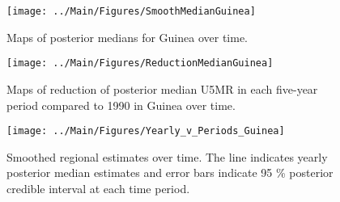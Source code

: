 \documentclass[12pt]{article}\usepackage[]{graphicx}\usepackage[]{color}
\newenvironment{knitrout}{}{} %
\begin{document}
\begin{knitrout}
\color{fgcolor}\begin{figure}[bht]

{\centering \texttt{[image: ../Main/Figures/SmoothMedianGuinea]} 

}

\caption[Maps of posterior medians for Guinea  over time]{Maps of posterior medians for Guinea  over time.}\label{fig:unnamed-chunk-154}
\end{figure}


\end{knitrout}
\begin{knitrout}
\color{fgcolor}\begin{figure}[bht]

{\centering \texttt{[image: ../Main/Figures/ReductionMedianGuinea]} 

}

\caption[Maps of reduction of posterior median U5MR in each five-year period compared to 1990 in Guinea over time]{Maps of reduction of posterior median U5MR in each five-year period compared to 1990 in Guinea over time.}\label{fig:unnamed-chunk-155}
\end{figure}


\end{knitrout}
\begin{knitrout}
\color{fgcolor}\begin{figure}[bht]

{\centering \texttt{[image: ../Main/Figures/Yearly\_v\_Periods\_Guinea]} 

}

\caption[Smoothed regional estimates over time]{Smoothed regional estimates over time. The line indicates yearly posterior median estimates and error bars indicate 95 \% posterior credible interval at each time period.}\label{fig:unnamed-chunk-156}
\end{figure}


\end{knitrout}
\end{document}
